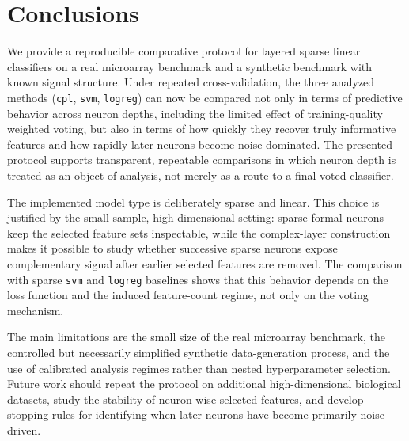 \section*{Conclusions}

We provide a reproducible comparative protocol for layered sparse linear classifiers on a real microarray
benchmark and a synthetic benchmark with known signal structure. Under repeated cross-validation, the three
analyzed methods (\texttt{cpl}, \texttt{svm}, \texttt{logreg}) can now be compared not only in terms of
predictive behavior across neuron depths, including the limited effect of training-quality weighted voting, but
also in terms of how quickly they recover truly informative features and how rapidly later neurons become
noise-dominated. The presented
protocol supports transparent, repeatable comparisons in which neuron depth is treated as an object of
analysis, not merely as a route to a final voted classifier.

The implemented model type is deliberately sparse and linear. This choice is justified by the small-sample,
high-dimensional setting: sparse formal neurons keep the selected feature sets inspectable, while the
complex-layer construction makes it possible to study whether successive sparse neurons expose complementary
signal after earlier selected features are removed. The comparison with sparse \texttt{svm} and
\texttt{logreg} baselines shows that this behavior depends on the loss function and the induced feature-count
regime, not only on the voting mechanism.

The main limitations are the small size of the real microarray benchmark, the controlled but necessarily
simplified synthetic data-generation process, and the use of calibrated analysis regimes rather than nested
hyperparameter selection. Future work should repeat the protocol on additional high-dimensional biological
datasets, study the stability of neuron-wise selected features, and develop stopping rules for identifying
when later neurons have become primarily noise-driven.

